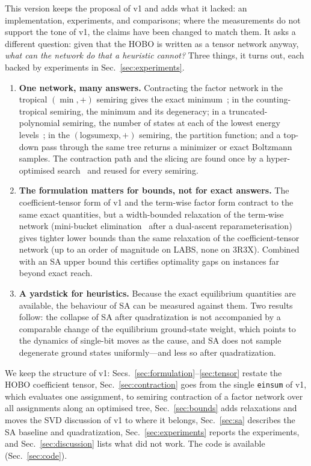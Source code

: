 \documentclass{article}
\begin{document}
This version keeps the proposal of v1 and adds what it lacked: an implementation, experiments, and comparisons; where the measurements do not support the tone of v1, the claims have been changed to match them. It asks a different question: given that the HOBO is written as a tensor network anyway, \emph{what can the network do that a heuristic cannot?} Three things, it turns out, each backed by experiments in Sec.~\ref{sec:experiments}.
\begin{enumerate}
\item \textbf{One network, many answers.} Contracting the factor network in the tropical $(\min,+)$ semiring gives the exact minimum~\cite{liu2021tropical}; in the counting-tropical semiring, the minimum and its degeneracy; in a truncated-polynomial semiring, the number of states at each of the lowest energy levels~\cite{liu2023generic}; in the $(\mathrm{logsumexp},+)$ semiring, the partition function; and a top-down pass through the same tree returns a minimizer or exact Boltzmann samples. The contraction path and the slicing are found once by a hyper-optimised search~\cite{gray2021hyper,cotengra} and reused for every semiring.
\item \textbf{The formulation matters for bounds, not for exact answers.} The coefficient-tensor form of v1 and the term-wise factor form contract to the same exact quantities, but a width-bounded relaxation of the term-wise network (mini-bucket elimination~\cite{dechter2003minibuckets} after a dual-ascent reparameterisation) gives tighter lower bounds than the same relaxation of the coefficient-tensor network (up to an order of magnitude on LABS, none on 3R3X). Combined with an SA upper bound this certifies optimality gaps on instances far beyond exact reach.
\item \textbf{A yardstick for heuristics.} Because the exact equilibrium quantities are available, the behaviour of SA can be measured against them. Two results follow: the collapse of SA after quadratization is not accompanied by a comparable change of the equilibrium ground-state weight, which points to the dynamics of single-bit moves as the cause, and SA does not sample degenerate ground states uniformly---and less so after quadratization.
\end{enumerate}

We keep the structure of v1: Secs.~\ref{sec:formulation}--\ref{sec:tensor} restate the HOBO coefficient tensor, Sec.~\ref{sec:contraction} goes from the single \texttt{einsum} of v1, which evaluates one assignment, to semiring contraction of a factor network over all assignments along an optimised tree, Sec.~\ref{sec:bounds} adds relaxations and moves the SVD discussion of v1 to where it belongs, Sec.~\ref{sec:sa} describes the SA baseline and quadratization, Sec.~\ref{sec:experiments} reports the experiments, and Sec.~\ref{sec:discussion} lists what did not work. The code is available (Sec.~\ref{sec:code}).
\end{document}
